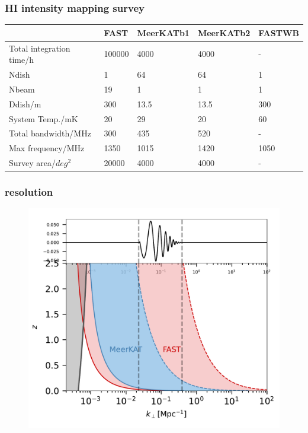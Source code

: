 \documentclass[UTF8]{beamer}
\begin{document}
    \begin{frame}
        \frametitle{HI intensity mapping survey}
        \begin{table}[]
            \begin{tabular}{l|llll}
            \hline
                                               & FAST   & MeerKATb1 & MeerKATb2 & FASTWB \\ \hline
            Total integration time/h             & 100000 & 4000          & 4000          &    -           \\
            Ndish                              & 1      & 64            & 64            & 1              \\
            Nbeam                              & 19     & 1             & 1             & 1              \\
            Ddish/m                              & 300    & 13.5          & 13.5          & 300            \\
            System Temp./mK                 & 20     & 29            & 20            & 60             \\
            Total bandwidth/MHz                    & 300    & 435           & 520           & -              \\
            Max frequency/MHz                      & 1350   & 1015          & 1420          & 1050           \\
            Survey area/$deg^2$ & 20000  & 4000          & 4000          &     -          \\ \hline
            \end{tabular}
            \end{table}
    \end{frame}
    \begin{frame}
        \frametitle{resolution}
        \begin{figure}
            \centering
            \includegraphics[scale=0.4]{fig03-resolution-z.pdf}
        \end{figure}
    \end{frame}
    
\end{document}
